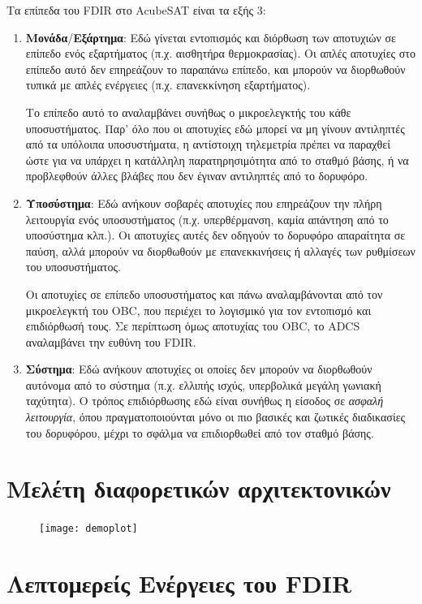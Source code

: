 \documentclass[a4paper,nobib]{tufte-book}
\begin{document}
Τα επίπεδα του \acs{FDIR} στο AcubeSAT είναι τα εξής 3:
\begin{enumerate}[label=Επίπεδο \arabic*]
	\item \textbf{Μονάδα}/\textbf{Εξάρτημα}: Εδώ γίνεται εντοπισμός και διόρθωση των αποτυχιών σε επίπεδο ενός εξαρτήματος (π.χ. αισθητήρα θερμοκρασίας). Οι απλές αποτυχίες στο επίπεδο αυτό δεν επηρεάζουν το παραπάνω επίπεδο, και μπορούν να διορθωθούν τυπικά με απλές ενέργειες (π.χ. επανεκκίνηση εξαρτήματος).
	
	Το επίπεδο αυτό το αναλαμβάνει συνήθως ο μικροελεγκτής του κάθε υποσυστήματος. Παρ' όλο που οι αποτυχίες εδώ μπορεί να μη γίνουν αντιληπτές από τα υπόλοιπα υποσυστήματα, η αντίστοιχη τηλεμετρία πρέπει να παραχθεί ώστε για να υπάρχει η κατάλληλη παρατηρησιμότητα από το σταθμό βάσης, ή να προβλεφθούν άλλες βλάβες που δεν έγιναν αντιληπτές από το δορυφόρο.
	\item \textbf{Υποσύστημα}: Εδώ ανήκουν σοβαρές αποτυχίες που επηρεάζουν την πλήρη λειτουργία ενός υποσυστήματος (π.χ. υπερθέρμανση, καμία απάντηση από το υποσύστημα κλπ.). Οι αποτυχίες αυτές δεν οδηγούν το δορυφόρο απαραίτητα σε παύση, αλλά μπορούν να διορθωθούν με επανεκκινήσεις ή αλλαγές των ρυθμίσεων του υποσυστήματος.
	
	Οι αποτυχίες σε επίπεδο υποσυστήματος και πάνω αναλαμβάνονται από τον μικροελεγκτή του \acf{OBC}, που περιέχει το λογισμικό για τον εντοπισμό και επιδιόρθωσή τους. Σε περίπτωση όμως αποτυχίας του \acf{OBC}, το \acf{ADCS} αναλαμβάνει την ευθύνη του \acf{FDIR}.
	\item \textbf{Σύστημα}: Εδώ ανήκουν αποτυχίες οι οποίες δεν μπορούν να διορθωθούν αυτόνομα από το σύστημα (π.χ. ελλιπής ισχύς, υπερβολικά μεγάλη γωνιακή ταχύτητα). Ο τρόπος επιδιόρθωσης εδώ είναι συνήθως η είσοδος σε \emph{ασφαλή λειτουργία}, όπου πραγματοποιούνται μόνο οι πιο βασικές και ζωτικές διαδικασίες του δορυφόρου, μέχρι το σφάλμα να επιδιορθωθεί από τον σταθμό βάσης.
\end{enumerate}

\section{Μελέτη διαφορετικών αρχιτεκτονικών}



\begin{figure}
	\centering
	\texttt{[image: demoplot]}
	\caption{}
\end{figure}

\FloatBarrier
\section{Λεπτομερείς Ενέργειες του FDIR}
\end{document}
